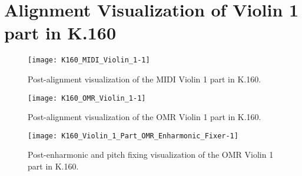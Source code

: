 \chapter{Alignment Visualization of Violin 1 part in K.160}\label{appc}

\clearpage

\begin{figure}[H]
\centering
\texttt{[image: K160\_MIDI\_Violin\_1-1]}
\caption{Post-alignment visualization of the MIDI Violin 1 part in K.160.}
\label{fig:k160postalignv1midi}
\end{figure}

\begin{figure}[H]
\centering
\texttt{[image: K160\_OMR\_Violin\_1-1]}
\caption{Post-alignment visualization of the OMR Violin 1 part in K.160.}
\label{fig:k160postalignv1omr}
\end{figure}

\begin{figure}[H]
\centering
\texttt{[image: K160\_Violin\_1\_Part\_OMR\_Enharmonic\_Fixer-1]}
\caption{Post-enharmonic and pitch fixing visualization of the OMR Violin 1 part in K.160.}
\label{fig:k160postfixv1}
\end{figure}

\clearpage
\newpage
